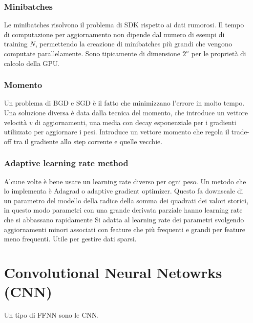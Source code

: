 		\subsubsection{Minibatches}
		Le minibatches risolvono il problema di SDK rispetto ai dati rumorosi.
		Il tempo di computazione per aggiornamento non dipende dal numero di esempi di training $N$, permettendo la creazione di minibatches pi\`u grandi che vengono computate parallelamente.
		Sono tipicamente di dimensione $2^n$ per le propriet\`a di calcolo della GPU.

		\subsubsection{Momento}
		Un problema di BGD e SGD \`e il fatto che minimizzano l'errore in molto tempo.
		Una soluzione diversa \`e data dalla tecnica del momento, che introduce un vettore velocit\`a $v$ di aggiornamenti, una media con decay esponenziale per i gradienti utilizzato per aggiornare i pesi.
		Introduce un vettore momento che regola il trade-off tra il gradiente allo step corrente e quelle vecchie.\\
		

		\subsubsection{Adaptive learning rate method}
		Alcune volte \`e bene usare un learning rate diverso per ogni peso.
		Un metodo che lo implementa \`e Adagrad o adaptive gradient optimizer.
		Questo fa downscale di un parametro del modello della radice della somma dei quadrati dei valori storici, in questo modo parametri con una grande derivata parziale hanno learning rate che si abbassano rapidamente
		Si adatta al learning rate dei parametri svolgendo aggiornamenti minori associati con feature che pi\`u frequenti e grandi per feature meno frequenti.
		Utile per gestire dati sparsi.\\
		

\section{Convolutional Neural Netowrks (CNN)}
Un tipo di FFNN sono le CNN.

